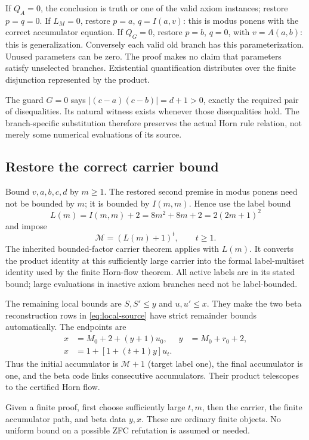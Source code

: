 \documentclass[11pt,letterpaper]{article}
\theoremstyle{definition}
\theoremstyle{remark}
\begin{document}
If $Q_A=0$, the conclusion is truth or one of the valid axiom instances;
restore $p=q=0$. If $L_M=0$, restore $p=a$, $q=I(a,v)$: this is
modus ponens with the correct accumulator equation. If $Q_G=0$, restore
$p=b$, $q=0$, with $v=A(a,b)$: this is generalization. Conversely each
valid old branch has this parameterization. Unused parameters can be
zero. The proof makes no claim that parameters satisfy unselected
branches. Existential quantification distributes over the finite
disjunction represented by the product.

The guard $G=0$ says
$|(c-a)(c-b)|=d+1>0$, exactly the required pair of disequalities.
Its natural witness exists whenever those disequalities hold.
The branch-specific substitution therefore preserves the actual
Horn rule relation, not merely some numerical evaluations of its source.

\subsection{Restore the correct carrier bound}

Bound $v,a,b,c,d$ by $m\ge1$. The restored second premise in modus
ponens need not be bounded by $m$; it is bounded by $I(m,m)$. Hence use
the label bound
\[
 L(m)=I(m,m)+2=8m^2+8m+2=2(2m+1)^2
\]
and impose
\begin{equation}\label{eq:newcarrier}
                       \mathcal M=(L(m)+1)^t,\qquad t\ge1.
\end{equation}
The inherited bounded-factor carrier theorem applies with $L(m)$.
It converts the product identity at this sufficiently large carrier into
the formal label-multiset identity used by the finite Horn-flow theorem.
All active labels are in its stated bound; large evaluations in inactive
axiom branches need not be label-bounded.

The remaining local bounds are $S,S'\le y$ and $u,u'\le x$.
They make the two beta reconstruction rows in \eqref{eq:local-source}
have strict remainder bounds automatically. The endpoints are
\begin{align*}
 x&=M_0+2+(y+1)u_0,&y&=M_0+r_0+2,\\
 x&=1+[1+(t+1)y]u_t.
\end{align*}
Thus the initial accumulator is $\mathcal M+1$ (target label one),
the final accumulator is one, and the beta code links consecutive
accumulators. Their product telescopes to the certified Horn flow.

Given a finite proof, first choose sufficiently large $t,m$, then the
carrier, the finite accumulator path, and beta data $y,x$. These are
ordinary finite objects. No uniform bound on a possible ZFC refutation
is assumed or needed.
\end{document}
